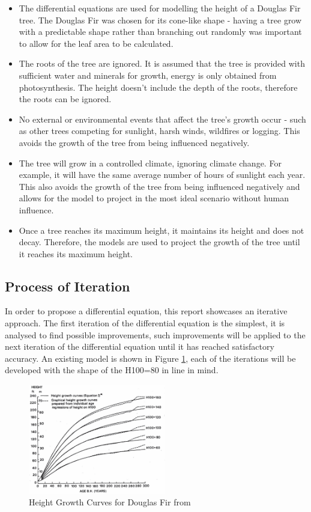 \documentclass[twocolumn]{article} %
\begin{document}
\begin{itemize}
\item The differential equations are used for modelling the height of a Douglas Fir tree. The Douglas Fir was chosen for its cone-like shape - having a tree grow with a predictable shape rather than branching out randomly was important to allow for the leaf area to be calculated.
\item The roots of the tree are ignored. It is assumed that the tree is provided with sufficient water and minerals for growth, energy is only obtained from photosynthesis. The height doesn’t include the depth of the roots, therefore the roots can be ignored.
\item No external or environmental events that affect the tree’s growth occur - such as other trees competing for sunlight, harsh winds, wildfires or logging. This avoids the growth of the tree from being influenced negatively.
\item The tree will grow in a controlled climate, ignoring climate change. For example, it will have the same average number of hours of sunlight each year. This also avoids the growth of the tree from being influenced negatively and allows for the model to project in the most ideal scenario without human influence.
\item Once a tree reaches its maximum height, it maintains its height and does not decay. Therefore, the models are used to project the growth of the tree until it reaches its maximum height.
\end{itemize}


\subsection{Process of Iteration}
In order to propose a differential equation, this report showcases an iterative approach. The first iteration of the differential equation is the simplest, it is analysed to find possible improvements, such improvements will be applied to the next iteration of the differential equation until it has reached satisfactory accuracy. An existing model is shown in Figure \ref{fig:exampleageheight}, each of the iterations will be developed with the shape of the H100=80 in line in mind.

\begin{figure}[htp]
    \centering
    \includegraphics[width=6cm]{Figures/Fig-ageheight.png}
    \caption{Height Growth Curves for Douglas Fir from \cite{five}}
    \label{fig:exampleageheight}
\end{figure}
\end{document}

